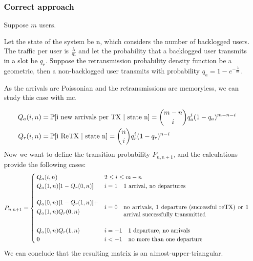 \subsubsection{Correct approach}

Suppose $m$ users.

Let the state of the system be n, which considers the number of backlogged users.
The traffic per user is $\frac{\lambda}{m}$ and let the probability that a backlogged user transmits in a slot be $q_r$. Suppose the retransmission probability density function be a geometric, then a non-backlogged user transmits with probability $q_a = 1-e^{-\frac{\lambda}{m}}$.

As the arrivals are Poissonian and the retransmissions are memoryless, we can study this case with \gls{mc}.

\begin{equation}\begin{split}
	Q_a(i,n) &= \mathbb{P}[\text{i new arrivals per TX | state n}] = \binom{m-n}{i} q_a^i (1-q_a)^{m-n-i} \\
	Q_r(i,n) &= \mathbb{P}[\text{i ReTX | state n}] = \binom{n}{i} q_r^i (1-q_r)^{n-i} \\
\end{split}\end{equation}
Now we want to define the transition probability $P_{n,n+1}$, and the calculations provide the following cases:
\begin{equation}
	P_{n,n+1} = \begin{cases}
	 Q_a(i,n) & 2 \le i \le m-n \\
	 Q_a(1,n) [1-Q_r(0,n)] & i=1 \quad \text{1 arrival, no departures}\\\\
	 \begin{aligned}
	 & Q_a(0,n) [1-Q_r(1,n)] + \\ & Q_a(1,n) Q_r(0,n)
	 \end{aligned}& i=0 \quad \parbox[t]{0.6\textwidth}{no arrivals, 1 departure (successful reTX) or 1 arrival successfully transmitted }\\\\
	 Q_a(0,n) Q_r(1,n) & i = -1 \quad \text{1 departure, no arrivals}\\
	 0 & i < -1 \quad \text{no more than one departure}
	\end{cases}
\end{equation}
We can conclude that the resulting matrix is an almost-upper-triangular.

